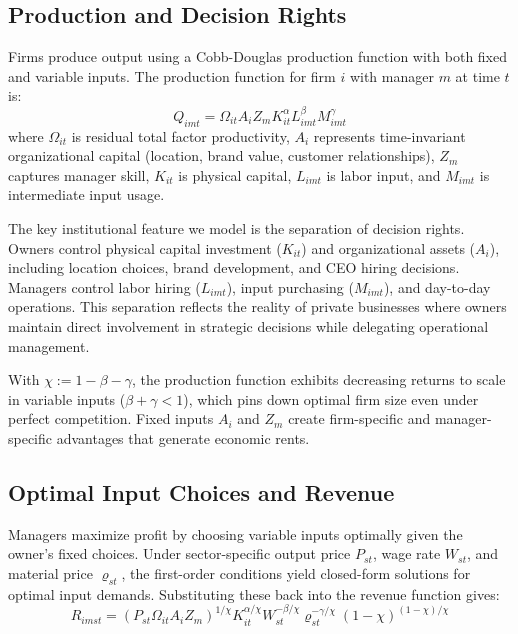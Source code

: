 \documentclass[11pt,a4paper]{article}
\begin{document}
\subsection{Production and Decision Rights}

Firms produce output using a Cobb-Douglas production function with both fixed and variable inputs. The production function for firm $i$ with manager $m$ at time $t$ is:
\begin{equation}\label{eq:production}
Q_{imt} = \Omega_{it}A_i Z_{m}  K_{it}^\alpha L_{imt}^{\beta} M_{imt}^{\gamma}
\end{equation}
where $\Omega_{it}$ is residual total factor productivity, $A_i$ represents time-invariant organizational capital (location, brand value, customer relationships), $Z_m$ captures manager skill, $K_{it}$ is physical capital, $L_{imt}$ is labor input, and $M_{imt}$ is intermediate input usage. 

The key institutional feature we model is the separation of decision rights. Owners control physical capital investment ($K_{it}$) and organizational assets ($A_i$), including location choices, brand development, and CEO hiring decisions. Managers control labor hiring ($L_{imt}$), input purchasing ($M_{imt}$), and day-to-day operations. This separation reflects the reality of private businesses where owners maintain direct involvement in strategic decisions while delegating operational management.

With $\chi := 1 - \beta - \gamma$, the production function exhibits decreasing returns to scale in variable inputs ($\beta + \gamma < 1$), which pins down optimal firm size even under perfect competition. Fixed inputs $A_i$ and $Z_m$ create firm-specific and manager-specific advantages that generate economic rents.

\subsection{Optimal Input Choices and Revenue}

Managers maximize profit by choosing variable inputs optimally given the owner's fixed choices. Under sector-specific output price $P_{st}$, wage rate $W_{st}$, and material price $\varrho_{st}$, the first-order conditions yield closed-form solutions for optimal input demands. Substituting these back into the revenue function gives:
\begin{equation}\label{eq:revenue}
R_{imst} = (P_{st}\Omega_{it}A_i Z_m)^{1/\chi}
K_{it}^{\alpha/\chi}
W_{st}^{-\beta/\chi}
\varrho_{st}^{-\gamma/\chi}
(1-\chi)^{(1-\chi)/\chi}
\end{equation}
\end{document}
